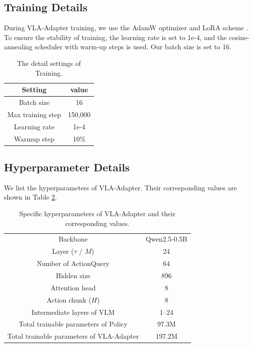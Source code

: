 \renewcommand{\thetable}{F\arabic{table}}
\renewcommand{\theHtable}{F\arabic{table}}
\setcounter{table}{0}

\subsection{Training Details}\label{AppendixE1}
During VLA-Adapter training, we use the AdamW \citep{AdamW-2019} optimizer and LoRA scheme \citep{LoRA-2022}. To ensure the stability of training, the learning rate is set to 1e-4, and the cosine-annealing scheduler with warm-up steps is used. Our batch size is set to 16.

\begin{table}[!htbp]
	\centering
	\caption{The detail settings of Training.}\label{TableE1}%
	\begin{tabular}{c|c}
		\toprule[1pt]
		Setting & value \\
		\midrule[0.5pt]  
            Batch size & 16 \\
		Max training step & 150,000 \\
		Learning rate & 1e-4 \\
		Warmup step & 10\% \\
		\bottomrule[1pt]
	\end{tabular}%
\end{table}%

\FloatBarrier
\subsection{Hyperparameter Details}\label{AppendixE2}
We list the hyperparameters of VLA-Adapter. Their corresponding values are shown in Table \ref{TableE2}.

\begin{table}[!htbp]
	\centering
	\caption{Specific hyperparameters of VLA-Adapter and their corresponding values.}\label{TableE2}%
	\begin{tabular}{c|c}
		\toprule[1pt]
		Backbone & Qwen2.5-0.5B\\
		Layer ($\tau$ / $M$) & 24  \\
		Number of ActionQuery & 64  \\
		Hidden size & 896   \\
		Attention head & 8      \\
		Action chunk ($H$) & 8\\
		Intermediate layers of VLM & 1--24\\
		\midrule[0.5pt]
		Total trainable parameters of Policy  &97.3M\\
            Total trainable parameters of VLA-Adapter    &197.2M\\
		\bottomrule[1pt]
	\end{tabular}%
\end{table}%

